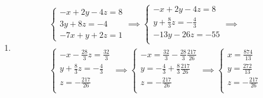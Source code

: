 \documentclass{article}
\begin{document}
\begin{enumerate}
{\begin{enumerate}
{\begin{displaymath}
\begin{cases}
                            y = t
                        \end{cases}
                    \end{displaymath}
                }
                \item {
                    \begin{gather*}
                        \begin{cases}
                            -x+2y-4z = 8 \\
                            3y+8z = -4 \\
                            -7x+y+2z = 1
                        \end{cases}
                        \implies
                        \begin{cases}
                            -x+2y-4z = 8 \\
                            y+\frac{8}{3}z = -\frac{4}{3} \\
                            -13y-26z = -55 \\
                        \end{cases}
                        \implies\\
                        \begin{cases}
                            -x-\frac{28}{3}z = \frac{32}{3} \\
                            y+\frac{8}{3}z = -\frac{4}{3} \\
                            z = -\frac{217}{26} \\
                        \end{cases}
                        \implies
                        \begin{cases}
                            -x = \frac{32}{3} - \frac{28}{3}\frac{217}{26} \\
                            y = -\frac{4}{3} + \frac{8}{3}\frac{217}{26} \\
                            z = -\frac{217}{26} \\
                        \end{cases}
                        \implies
                        \begin{cases}
                            x = \frac{874}{13} \\
                            y = \frac{272}{13} \\
                            z = -\frac{217}{26} \\
                        \end{cases}

\end{gather*}}
\end{enumerate}}
\end{enumerate}
\end{document}
